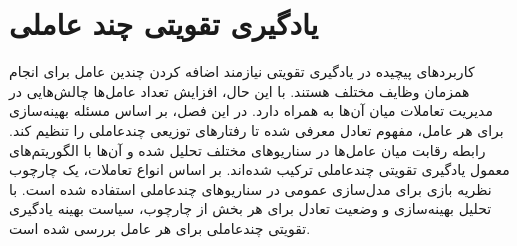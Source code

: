 \chapter{یادگیری تقویتی چند عاملی}
کاربردهای پیچیده در یادگیری تقویتی نیازمند اضافه کردن چندین عامل برای انجام همزمان وظایف مختلف هستند.
با این حال، افزایش تعداد عامل‌ها چالش‌هایی در مدیریت تعاملات میان آن‌ها به همراه دارد.
در این فصل، بر اساس مسئله بهینه‌سازی برای هر عامل، مفهوم تعادل معرفی شده تا رفتارهای توزیعی چندعاملی را تنظیم کند.
رابطه رقابت میان عامل‌ها در سناریوهای مختلف تحلیل شده و آن‌ها با الگوریتم‌های معمول یادگیری تقویتی چندعاملی ترکیب شده‌اند. بر اساس انواع تعاملات، یک چارچوب نظریه بازی برای مدل‌سازی عمومی در سناریوهای چندعاملی استفاده شده است. با تحلیل بهینه‌سازی و وضعیت تعادل برای هر بخش از چارچوب، سیاست بهینه یادگیری تقویتی چندعاملی برای هر عامل بررسی شده است.




  
    
    
    
    
%    
%    
    